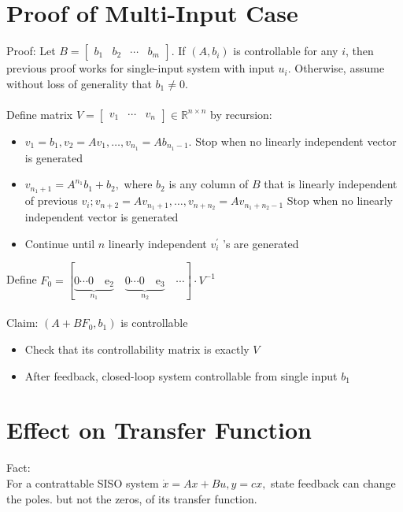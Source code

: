 \documentclass[10pt,a4paper,oneside]{article}
\begin{document}
\section{Proof of Multi-Input Case}
Proof: Let $B=\left[\begin{array}{llll}{b_{1}} & {b_{2}} & {\cdots} & {b_{m}}\end{array}\right]$. If $\left(A, b_{i}\right)$ is controllable for any $i$, then previous proof works for single-input system with input $u_{i} .$ Otherwise, assume without loss of generality that $b_{1} \neq 0$.\\
\\Define matrix $V=\left[\begin{array}{lll}{v_{1}} & {\cdots} & {v_{n}}\end{array}\right] \in \mathbb{R}^{n \times n}$ by recursion:
\begin{itemize}
\item $v_{1}=b_{1}, v_{2}=A v_{1}, \ldots, v_{n_{1}}=A b_{n_{1}-1} .$ Stop when no linearly independent vector is generated
\item $v_{n_{1}+1}=A^{n_{1}} b_{1}+b_{2},$ where $b_{2}$ is any column of $B$ that is linearly
independent of previous $v_{i} ; v_{n+2}=A v_{n_{1}+1}, \ldots, v_{n+n_{2}}=A v_{n_{1}+n_{2}-1}$
Stop when no linearly independent vector is generated
\item Continue until $n$ linearly independent $v_{i}^{\prime}$ 's are generated
\end{itemize}
Define $F_{0}=\left[\underbrace{0 \cdots 0\quad \mathrm{e}_{2}}_{n_{1}} \quad\underbrace{0 \cdots 0 \quad\mathrm{e}_{3}}_{n_{2}}\quad\cdots\right] \cdot V^{-1}$\\
\\
Claim: $\left(A+B F_{0}, b_{1}\right)$ is controllable
\begin{itemize}
\item Check that its controllability matrix is exactly $V$
\item After feedback, closed-loop system controllable from single input $b_{1}$
\end{itemize}
\section{Effect on Transfer Function}
Fact:\\
For a contrattable SISO system $\dot{x}=A x+B u, y=c x,$ state feedback can
change the poles. but not the zeros, of its transfer function.
\end{document}
